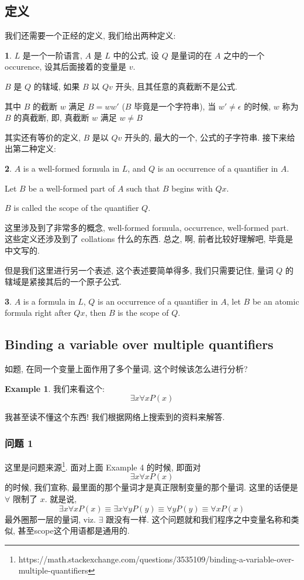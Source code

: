 \documentclass[a4paper, 12pt]{ctexbook} %
\theoremstyle{plain}
\newtheorem*{comment}{Comment}
\theoremstyle{definition}
\newtheorem{example}{\llap{$\bigstar$}\space Example}
\newtheorem{definition}{\llap{Definition}\space}[section]
\theoremstyle{remark}
\begin{document}
\subsection{定义}
我们还需要一个正经的定义, 我们给出两种定义: 
\begin{definition}
$L$ 是一个一阶语言, $A$ 是 $L$ 中的公式, 设 $Q$ 是量词的在 $A$ 之中的一个occurence, 设其后面接着的变量是 $v$. 

$B$ 是 $Q$ 的辖域, 如果 $B$ 以 $Qv$ 开头, 且其任意的真截断不是公式. 

其中 $B$ 的截断 $w$ 满足 $B = w w'$ ($B$ 毕竟是一个字符串), 当 $w' \ne \epsilon$ 的时候, $w$ 称为 $B$ 的真截断, 即, 真截断 $w$ 满足 $w  \ne B$
\end{definition}
\begin{comment}
$\epsilon$ 是空字符串. 这里还是建议不要遗忘这点. 
\end{comment}

其实还有等价的定义, $B$ 是以 $Q v$ 开头的, 最大的一个, 公式的子字符串.  接下来给出第二种定义: 
\begin{definition}
$A$ is a well-formed formula in $L$, and $Q$ is an occurrence of a quantifier in $A$. 

Let $B$ be a well-formed part of $A$ such that $B$ begins with $Qx$.

$B$ is called the scope of the quantifier $Q$. 
\end{definition}
这里涉及到了非常多的概念, well-formed formula, occurrence, well-formed part. 这些定义还涉及到了 collations 什么的东西. 总之, 啊, 前者比较好理解吧, 毕竟是中文写的. 

但是我们这里进行另一个表述, 这个表述要简单得多, 
我们只需要记住, 量词 $Q$ 的辖域是紧接其后的一个原子公式. 

\begin{definition}
$A$ is a formula in $L$, $Q$ is an occurrence of a quantifier in $A$, 
let $B$ be an atomic formula right after $Q x$, then $B$ is the scope of $Q$.
\end{definition}
\subsection{Binding a variable over multiple quantifiers}
如题, 在同一个变量上面作用了多个量词, 这个时候该怎么进行分析? 
\begin{example}
我们来看这个: 
\[
\exists x \forall  x P \left(x\right)
\]
\end{example}
我甚至读不懂这个东西! 我们根据网络上搜索到的资料来解答. 
\subsubsection{问题 1} 
这里是问题来源\footnote{https://math.stackexchange.com/questions/3535109/binding-a-variable-over-multiple-quantifiers}. 
面对上面 Example 4 的时候, 即面对
\[
\exists x \forall  x P\left(x\right)
\]
的时候, 我们宣称, 最里面的那个量词才是真正限制变量的那个量词. 
这里的话便是 $\forall $ 限制了 $x$. 就是说, 
\[
\exists x \forall  x P \left(x\right) \equiv  \exists x \forall  y P\left(y\right) \equiv  
\forall  y P\left(y\right) \equiv  \forall  x P\left(x\right)
\]
最外圈那一层的量词, viz. $\exists$ 跟没有一样. 这个问题就和我们程序之中变量名称和类似, 
甚至scope这个用语都是通用的. 
\end{document}
